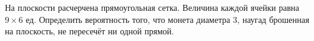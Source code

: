 \begin{problem}
На плоскости расчерчена прямоугольная сетка. Величина каждой ячейки равна $9\times6$ ед. Определить вероятность того, что монета диаметра 3, наугад брошенная на плоскость, не пересечёт ни одной прямой.
\end{problem}

